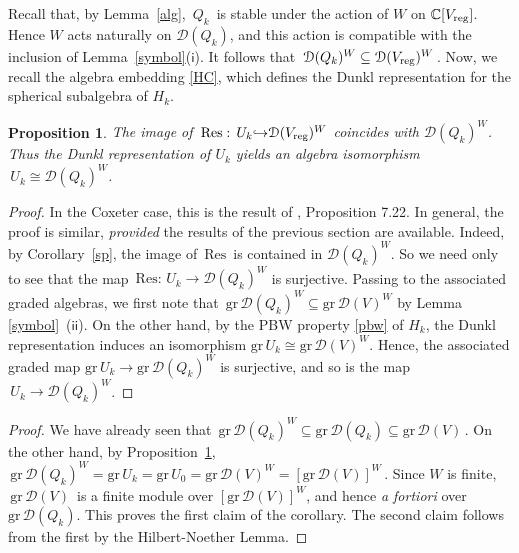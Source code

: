 \documentclass{amsart}
\newtheorem{prop}[theorem]{Proposition}
\newtheorem{cor}[theorem]{Corollary}
\theoremstyle{definition}
\theoremstyle{remark}
\numberwithin{equation}{section}
\begin{document}
Recall that, by Lemma~\ref{alg}, $\, Q_k \,$ is stable under the
action of $W$ on $ {\mathbb{C}}[{V_{\rm{reg}}}] $. Hence $ W $ acts naturally on $
{\mathcal{D}}(Q_k) $, and this action is compatible with the inclusion of
Lemma~\ref{symbol}($\mathsf i$). It follows that $\, {\mathcal{D}}(Q_k)^W
\subseteq {\mathcal{D}}({V_{\rm{reg}}})^W\,$. Now, we recall the algebra embedding \eqref{HC},
which defines the Dunkl representation for the spherical subalgebra
of $ H_k $.
\begin{prop}
\label{is} The image of $\,{\mathrm{Res}}: \,U_k {\hookrightarrow} {\mathcal{D}}({V_{\rm{reg}}})^W$  coincides with
$ {\mathcal{D}}(Q_k)^W $. Thus the Dunkl representation of $ U_k $ yields an algebra
isomorphism $\,U_k \cong {\mathcal{D}}(Q_k)^W$.
\end{prop}
\begin{proof}
In the Coxeter case, this is the result of \cite{BEG}, Proposition
7.22. In general, the proof is similar, {\it provided} the
results of the previous section are available. Indeed,
by Corollary~\ref{sp}, the image of $\, {\mathrm{Res}} \,$ is contained
in $ {\mathcal{D}}(Q_k)^W $. So we need only to see that the map
$\,{\mathrm{Res}}: \,U_k \to {\mathcal{D}}(Q_k)^W $ is surjective.
Passing to the associated graded algebras, we first note that
$\,{\mathrm{gr}}\,{\mathcal{D}}(Q_k)^W \subseteq {\mathrm{gr}}\,{\mathcal{D}}(V)^W $ by Lemma
\ref{symbol}~($\mathsf{ii}$). On the other hand, by the PBW
property \eqref{pbw} of $ H_k $, the Dunkl
representation induces an isomorphism ${\mathrm{gr}}\,U_k \cong
{\mathrm{gr}}\,{\mathcal{D}}(V)^W $. Hence, the associated graded map ${\mathrm{gr}}\,U_k \to
{\mathrm{gr}}\,{\mathcal{D}}(Q_k)^W$ is surjective, and so is the map
$\, U_k \to {\mathcal{D}}(Q_k)^W $.
\end{proof}
\begin{proof}
We have already seen that $\, {\mathrm{gr}}\,{\mathcal{D}}(Q_k)^W \subseteq {\mathrm{gr}}\,{\mathcal{D}}(Q_k)
\subseteq {\mathrm{gr}}\,{\mathcal{D}}(V) \,$.
On the other hand, by Proposition~\ref{is}, $\,{\mathrm{gr}}\,{\mathcal{D}}(Q_k)^W =
{\mathrm{gr}}\,U_k = {\mathrm{gr}}\,U_0 = {\mathrm{gr}}\,{\mathcal{D}}(V)^W = [{\mathrm{gr}}\,{\mathcal{D}}(V)]^W \,$. Since
$W$ is finite, $\,{\mathrm{gr}}\,{\mathcal{D}}(V) \,$ is a finite module over $ [{\mathrm{gr}}\,{\mathcal{D}}(V)]^W $,
and hence {\it a fortiori}
over $ {\mathrm{gr}}\,{\mathcal{D}}(Q_k) $. This proves the first claim of the corollary.
The second claim follows from the first by the Hilbert-Noether Lemma.
\end{proof}
\end{document}
